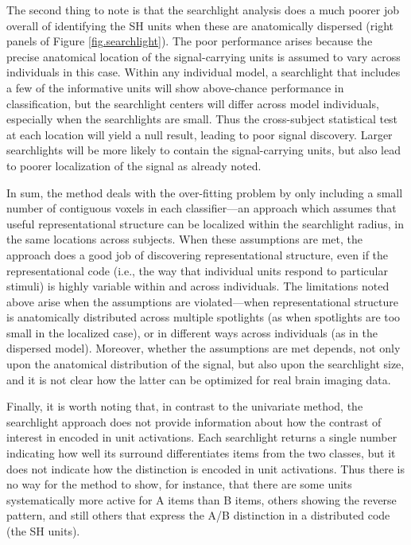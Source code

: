 The second thing to note is that the searchlight analysis does a much poorer job overall of identifying the SH units when these are anatomically dispersed (right panels of Figure \ref{fig.searchlight}). The poor performance arises because the precise anatomical location of the signal-carrying units is assumed to vary across individuals in this case. Within any individual model, a searchlight that includes a few of the informative units will show above-chance performance in classification, but the searchlight centers will differ across model individuals, especially when the searchlights are small. Thus the cross-subject statistical test at each location will yield a null result, leading to poor signal discovery. Larger searchlights will be more likely to contain the signal-carrying units, but also lead to poorer localization of the signal as already noted. 

In sum, the method deals with the over-fitting problem by only including a small number of contiguous voxels in each classifier---an approach which assumes that useful representational structure can be localized within the searchlight radius, in the same locations across subjects. When these assumptions are met, the approach does a good job of discovering representational structure, even if the representational code (i.e., the way that individual units respond to particular stimuli) is highly variable within and across individuals. The limitations noted above arise when the assumptions are violated---when representational structure is anatomically distributed across multiple spotlights (as when spotlights are too small in the localized case), or in different ways across individuals (as in the dispersed model). Moreover, whether the assumptions are met depends, not only upon the anatomical distribution of the signal, but also upon the searchlight size, and it is not clear how the latter can be optimized for real brain imaging data.  

Finally, it is worth noting that, in contrast to the univariate method, the searchlight approach does not provide information about how the contrast of interest in encoded in unit activations. Each searchlight returns a single number indicating how well its surround differentiates items from the two classes, but it does not indicate how the distinction is encoded in unit activations. Thus there is no way for the method to show, for instance, that there are some units systematically more active for A items than B items, others showing the reverse pattern, and still others that express the A/B distinction in a distributed code (the SH units).

